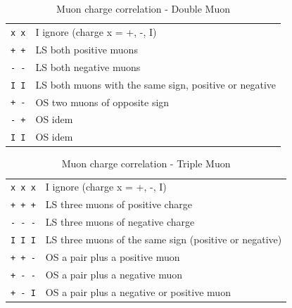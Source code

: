 % 
% 
% 
% 
% 
% 

\begin{table}[ht]
\caption{Muon charge correlation - Double Muon}
\vspace{5mm}
\centering
\begin{tabular}{|c|l|}\hline
\verb|x x| & I ignore (charge x = +, -, I) \\
\verb|+ +| & LS both positive muons \\
\verb|- -| & LS both negative muons \\
\verb|I I| & LS both muons with the same sign, positive or negative \\
\verb|+ -| & OS two muons of opposite sign \\
\verb|- +| & OS idem \\
\verb|I I| & OS idem \\\hline
\end{tabular}
\label{tab:gtl:muon_charge_corr_double}
\end{table}

\begin{table}[ht]
\caption{Muon charge correlation - Triple Muon}
\vspace{5mm}
\centering
\begin{tabular}{|c|l|}\hline
\verb|x x x| & I  ignore (charge x = +, -, I) \\
\verb|+ + +| & LS three muons of positive charge \\
\verb|- - -| & LS three muons of negative charge \\
\verb|I I I| & LS three muons of the same sign (positive or negative) \\
\verb|+ + -| & OS a pair plus a positive muon \\
\verb|+ - -| & OS a pair plus a negative muon \\
\verb|+ - I| & OS a pair plus a negative or positive muon \\\hline
\end{tabular}
\label{tab:gtl:muon_charge_corr_triple}
\end{table}

